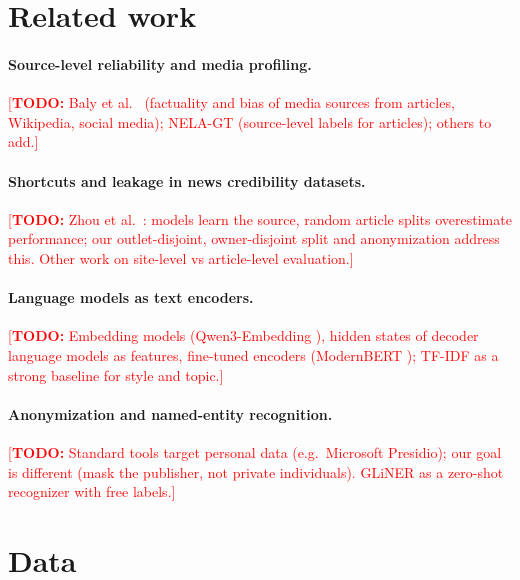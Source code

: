 \documentclass[11pt,a4paper]{article}
\newcommand{\todo}[1]{\textcolor{red}{[\textbf{TODO:} #1]}}
\begin{document}
\section{Related work}\label{sec:related}

\paragraph{Source-level reliability and media profiling.}
\todo{Baly et al.\ \citep{baly2018predicting,baly2020written} (factuality and bias of media sources from articles,
Wikipedia, social media); NELA-GT \citep{gruppi2021nela} (source-level labels for articles); others to add.}

\paragraph{Shortcuts and leakage in news credibility datasets.}
\todo{Zhou et al.\ \citep{zhou2021hidden}: models learn the source, random article splits overestimate performance;
our outlet-disjoint, owner-disjoint split and anonymization address this. Other work on site-level vs article-level
evaluation.}

\paragraph{Language models as text encoders.}
\todo{Embedding models (Qwen3-Embedding \citep{zhang2025qwen3}), hidden states of decoder language models as features,
fine-tuned encoders (ModernBERT \citep{warner2024modernbert}); TF-IDF as a strong baseline for style and topic.}

\paragraph{Anonymization and named-entity recognition.}
\todo{Standard tools target personal data (e.g.\ Microsoft Presidio); our goal is different (mask the publisher, not
private individuals). GLiNER \citep{zaratiana2024gliner} as a zero-shot recognizer with free labels.}

\section{Data}\label{sec:data}
\end{document}
